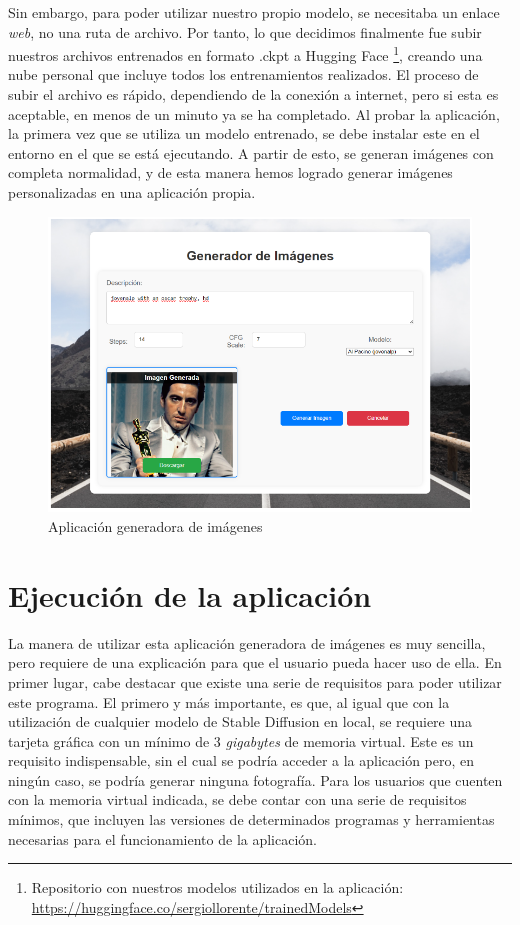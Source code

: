 Sin embargo, para poder utilizar nuestro propio modelo, se necesitaba un enlace \textit{web}, no una ruta de archivo. Por tanto, lo que decidimos finalmente fue subir nuestros archivos entrenados en formato .ckpt a Hugging Face \footnote{Repositorio con nuestros modelos utilizados en la aplicación: \url{https://huggingface.co/sergiollorente/trainedModels}}, creando una nube personal que incluye todos los entrenamientos realizados. El proceso de subir el archivo es rápido, dependiendo de la conexión a internet, pero si esta es aceptable, en menos de un minuto ya se ha completado. Al probar la aplicación, la primera vez que se utiliza un modelo entrenado, se debe instalar este en el entorno en el que se está ejecutando. A partir de esto, se generan imágenes con completa normalidad, y de esta manera hemos logrado generar imágenes personalizadas en una aplicación propia.\\

\begin{figure}[!htb]
	\centering
	\includegraphics[width = 1
	\textwidth]{Imagenes/Vectorial/genapp.png}
	\caption{Aplicación generadora de imágenes}
	\label{fig:appgen}
\end{figure}




\section{Ejecución de la aplicación}

La manera de utilizar esta aplicación generadora de imágenes es muy sencilla, pero requiere de una explicación para que el usuario pueda hacer uso de ella. En primer lugar, cabe destacar que existe una serie de requisitos para poder utilizar este programa. El primero y más importante, es que, al igual que con la utilización de cualquier modelo de Stable Diffusion en local, se requiere una tarjeta gráfica con un mínimo de 3 \textit{gigabytes} de memoria virtual. Este es un requisito indispensable, sin el cual se podría acceder a la aplicación pero, en ningún caso, se podría generar ninguna fotografía. Para los usuarios que cuenten con la memoria virtual indicada, se debe contar con una serie de requisitos mínimos, que incluyen las versiones de determinados programas y herramientas necesarias para el funcionamiento de la aplicación.\\

